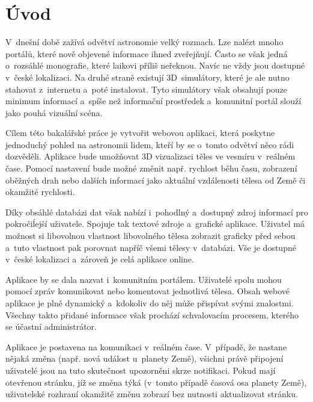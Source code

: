 \documentclass[a4paper,12pt]{article}
\begin{document}

\clearpage
\pagestyle{plain}		%

 {}
\section*{Úvod}
\label{uvod}

V~dnešní době zažívá odvětví astronomie velký rozmach. Lze nalézt mnoho portálů, které nově objevené informace ihned zveřejňují. Často se však jedná o~rozsáhlé monografie, které laikovi příliš neřeknou. Navíc ne vždy jsou dostupné v~české lokalizaci. Na druhé straně existují 3D~simulátory, které je ale nutno stahovat z~internetu a~poté instalovat. Tyto simulátory však obsahují pouze minimum informací a~spíše než informační prostředek a~komunitní portál slouží jako pouhá vizuální scéna.

Cílem této bakalářské práce je vytvořit webovou aplikaci, která poskytne jednoduchý pohled na astronomii lidem, kteří by se o~tomto odvětví něco rádi dozvěděli. Aplikace bude umožňovat 3D vizualizaci těles ve vesmíru v~reálném čase. Pomocí nastavení bude možné změnit např. rychlost běhu času, zobrazení oběžných drah nebo dalších informací jako aktuální vzdálenosti tělesa od Země či okamžité rychlosti.

Díky obsáhlé databázi dat však nabízí i~pohodlný a~dostupný zdroj informací pro pokročiĺejší uživatele. Spojuje tak textové zdroje a~grafické aplikace. Uživatel má možnost si libovolnou vlastnost libovolného tělesa zobrazit graficky před sebou a~tuto vlastnost pak porovnat napříč všemi tělesy v~databázi. Vše je dostupné v~české lokalizaci a~zároveň je celá aplikace online.

Aplikace by se dala nazvat i~komunitním portálem. Uživatelé spolu mohou pomocí zpráv komunikovat nebo komentovat jednotlivá tělesa. Obsah webové aplikace je plně dynamický a~kdokoliv do něj může přispívat svými znalostmi. Všechny takto přidané informace však prochází schvalovacím procesem, kterého se účastní administrátor.

Aplikace je postavena na komunikaci v~reálném čase. V~případě, že nastane nějaká změna (např. nová událost u~planety Země), všichni právě připojení uživatelé jsou na tuto skutečnost upozorněni skrze notifikaci. Pokud mají otevřenou stránku, jíž se změna týká (v~tomto případě časová osa planety Země), uživatelské rozhraní okamžitě změnu zobrazí bez nutnosti aktualizovat stránku.
\end{document}
